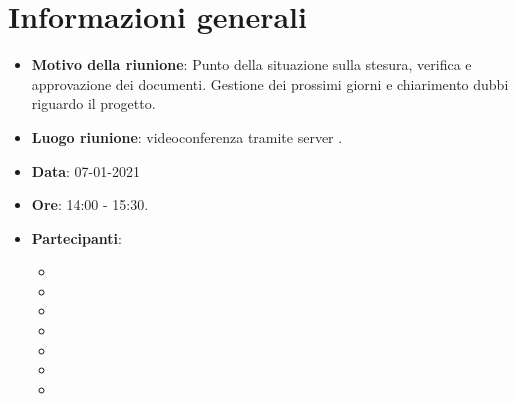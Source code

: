 \section{Informazioni generali}
\begin{itemize}
\item \textbf{Motivo della riunione}: Punto della situazione sulla stesura, verifica e approvazione dei documenti. Gestione dei prossimi giorni e chiarimento dubbi riguardo il progetto.
\item \textbf{Luogo riunione}: videoconferenza tramite server .
\item \textbf{Data}: 07-01-2021
\item \textbf{Ore}: 14:00 - 15:30.
\item \textbf{Partecipanti}:
	\begin{itemize}
	\item \BM{}
	\item \SG{}
	\item \SP{}
	\item \SH{}
	\item \PA{}
	\item \ZM{}
	\item \RA{}
	\end{itemize}
\end{itemize}

\newpage
